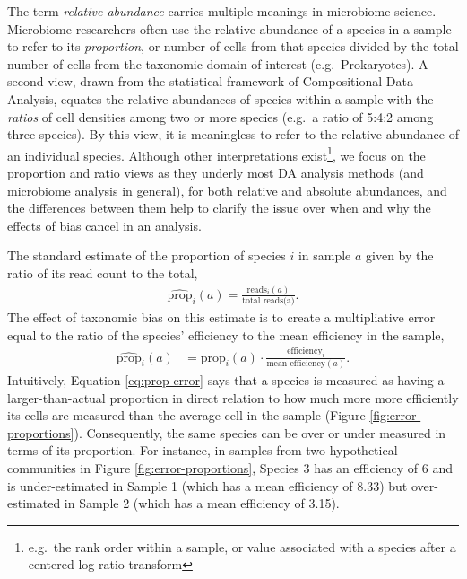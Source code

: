 \documentclass[
]{article}
\theoremstyle{definition}
\theoremstyle{definition}
\theoremstyle{definition}
\theoremstyle{definition}
\theoremstyle{remark}
\begin{document}
The term \emph{relative abundance} carries multiple meanings in microbiome science.
Microbiome researchers often use the relative abundance of a species in a sample to refer to its \emph{proportion}, or number of cells from that species divided by the total number of cells from the taxonomic domain of interest (e.g.~Prokaryotes).
A second view, drawn from the statistical framework of Compositional Data Analysis, equates the relative abundances of species within a sample with the \emph{ratios} of cell densities among two or more species (e.g.~a ratio of 5:4:2 among three species).
By this view, it is meaningless to refer to the relative abundance of an individual species.
Although other interpretations exist\footnote{e.g.~the rank order within a sample, or value associated with a species after a centered-log-ratio transform}, we focus on the proportion and ratio views as they underly most DA analysis methods (and microbiome analysis in general), for both relative and absolute abundances, and the differences between them help to clarify the issue over when and why the effects of bias cancel in an analysis.

The standard estimate of the proportion of species \(i\) in sample \(a\) given by the ratio of its read count to the total,
\begin{align*}
  \hat{\text{prop}}_{i}(a) = \frac{\text{reads}_i(a)}{\text{total reads(a)}}.
\end{align*}
The effect of taxonomic bias on this estimate is to create a multipliative error equal to the ratio of the species' efficiency to the mean efficiency in the sample,
\begin{align}
  \label{eq:prop-error}
  \hat{\text{prop}}_{i}(a)
  &= \text{prop}_{i}(a) \cdot \frac{\text{efficiency}_{i}}{\text{mean efficiency}(a)}.
\end{align}
Intuitively, Equation \eqref{eq:prop-error} says that a species is measured as having a larger-than-actual proportion in direct relation to how much more more efficiently its cells are measured than the average cell in the sample (Figure \ref{fig:error-proportions}).
Consequently, the same species can be over or under measured in terms of its proportion.
For instance, in samples from two hypothetical communities in Figure \ref{fig:error-proportions}, Species 3 has an efficiency of 6 and is under-estimated in Sample 1 (which has a mean efficiency of 8.33) but over-estimated in Sample 2 (which has a mean efficiency of 3.15).
\end{document}
